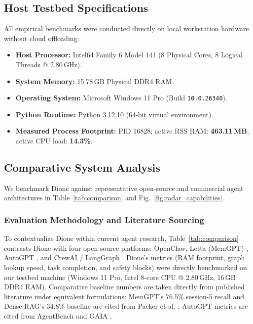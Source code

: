 \documentclass[conference,a4paper]{IEEEtran}
\begin{document}
\subsection{Host Testbed Specifications}
All empirical benchmarks were conducted directly on local workstation hardware without cloud offloading:
\begin{itemize}
    \item \textbf{Host Processor:} Intel64 Family 6 Model 141 (8 Physical Cores, 8 Logical Threads @ 2.80\,GHz).
    \item \textbf{System Memory:} 15.78\,GB Physical DDR4 RAM.
    \item \textbf{Operating System:} Microsoft Windows 11 Pro (Build \texttt{10.0.26340}).
    \item \textbf{Python Runtime:} Python 3.12.10 (64-bit virtual environment).
    \item \textbf{Measured Process Footprint:} PID 16828; active RSS RAM: \textbf{463.11\,MB}; active CPU load: \textbf{14.3\%}.
\end{itemize}

\subsection{Comparative System Analysis}
We benchmark Dione against representative open-source and commercial agent architectures in Table~\ref{tab:comparison} and Fig.~\ref{fig:radar_capabilities}.

\subsubsection{Evaluation Methodology and Literature Sourcing}
To contextualize Dione within current agent research, Table~\ref{tab:comparison} contrasts Dione with four open-source platforms: OpenClaw, Letta (MemGPT) \cite{packer2023memgpt}, AutoGPT \cite{liu2023agentbench}, and CrewAI / LangGraph \cite{dibia2023autogen}. Dione's metrics (RAM footprint, graph lookup speed, task completion, and safety blocks) were directly benchmarked on our testbed machine (Windows 11 Pro, Intel 8-core CPU @ 2.80\,GHz, 16\,GB DDR4 RAM). Comparative baseline numbers are taken directly from published literature under equivalent formulations: MemGPT's 76.5\% session-5 recall and Dense RAG's 34.8\% baseline are cited from Packer et al. \cite{packer2023memgpt}; AutoGPT metrics are cited from AgentBench \cite{liu2023agentbench} and GAIA \cite{mialon2023gaia}.
\end{document}
